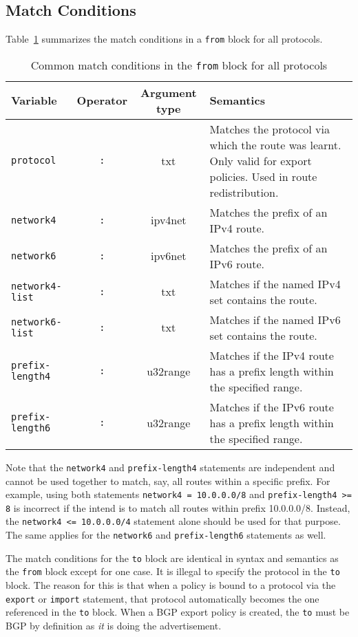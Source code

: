 \subsection{Match Conditions}
Table~\ref{policy_common_match_from} summarizes the match conditions
in a {\tt from} block for all protocols.
\begin{table}[h]
\centering
\begin{tabular}{|l|c|c|p{7.5cm}|}
\hline
Variable & Operator & Argument type & Semantics \\
\hline\hline
{\tt protocol} & {\tt :} & txt & Matches the protocol via which the route was
learnt.  Only valid for export policies.  Used in route redistribution. \\
\hline
{\tt network4} & {\tt :} & ipv4net & Matches the prefix of an IPv4 route. \\
{\tt network6} & {\tt :} & ipv6net & Matches the prefix of an IPv6 route. \\
\hline
{\tt network4-list} & {\tt :} & txt & Matches if the named IPv4 set
contains the route.\\
{\tt network6-list} & {\tt :} & txt & Matches if the named IPv6 set
contains the route.\\
\hline
{\tt prefix-length4} & {\tt :} & u32range & Matches if the IPv4 route has a
prefix length within the specified range. \\
{\tt prefix-length6} & {\tt :} & u32range & Matches if the IPv6 route has a
prefix length within the specified range. \\
\hline
\end{tabular}
\caption{\label{policy_common_match_from}Common match conditions in the {\tt from}
block for all protocols}
\end{table}

Note that the {\tt network4} and {\tt prefix-length4} statements
are independent and cannot be used together to match, say, all routes
within a specific prefix. For example, using both statements
{\tt network4 = 10.0.0.0/8} and {\tt prefix-length4 >= 8} is incorrect
if the intend is to match all routes within prefix 10.0.0.0/8.
Instead, the {\tt network4 <= 10.0.0.0/4} statement alone should be used
for that purpose.
The same applies for the {\tt network6} and {\tt prefix-length6}
statements as well.

The match conditions for the {\tt to} block are identical in syntax and
semantics as the {\tt from} block except for one case.  It is illegal to specify
the protocol in the {\tt to} block.  The reason for this is that when a policy
is bound to a protocol via the {\tt export} or {\tt import} statement, that
protocol automatically becomes the one referenced in the {\tt to} block.  When a
BGP export policy is created, the {\tt to} must be BGP by definition as {\em it}
is doing the advertisement.

